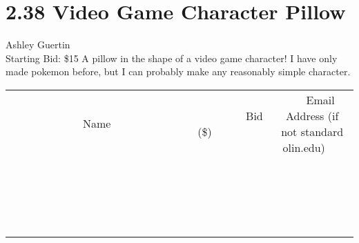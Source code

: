 \documentclass[11pt]{article}
\begin{document}
\section*{2.38 Video Game Character Pillow}
Ashley Guertin
\\
Starting Bid: \$15
\newline
A pillow in the shape of a video game character! I have only made pokemon before, but I can probably make any reasonably simple character.
\\[3ex]
\begin{tabular}{c c c}
~~~~~~~~~~~~~Name~~~~~~~~~~~~~ & ~~~~~~~~~Bid (\$)~~~~~~~~~  & ~~~Email Address (if not standard olin.edu)~~~\\
 & & \\
\hline
 & & \\
\hline
 & & \\
\hline
 & & \\
\hline
 & & \\
\hline
 & & \\
\hline
 & & \\
\hline
 & & \\
\hline
 & & \\
\hline
 & & \\
\hline
 & & \\
\hline
 & & \\
\hline
 & & \\
\hline
 & & \\
\hline
 & & \\
\hline
 & & \\
\hline
 & & \\
\hline
 & & \\
\hline
 & & \\
\hline
\end{tabular}
\newpage
\end{document}
